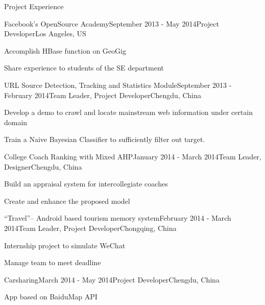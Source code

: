 \documentclass{resume} %
\begin{document}
\begin{rSection}{Project Experience}

\begin{rSubsection}{Facebook's OpenSource Academy}{September 2013 - May 2014}{Project Developer}{Los Angeles, US}
\item Accomplish HBase function on GeoGig
\item Share experience to students of the SE department 
\end{rSubsection}

\begin{rSubsection}{URL Source Detection, Tracking and Statistics Module}{September 2013 - February 2014}{Team Leader, Project Developer}{Chengdu, China}
\item Develop a demo to crawl and locate mainstream web information under certain domain
\item Train a Naive Bayesian Classifier to sufficiently filter out target.
\end{rSubsection}

\begin{rSubsection}{College Coach Ranking with Mixed AHP}{January 2014 - March 2014}{Team Leader, Designer}{Chengdu, China}
\item Build an appraisal system for intercollegiate coaches
\item Create and enhance the proposed model
\end{rSubsection}

\begin{rSubsection}{``Travel''-- Android based tourism memory system}{February 2014 - March 2014}{Team Leader, Project Developer}{Chongqing, China}
\item Internship project to simulate WeChat
\item Manage team to meet deadline
\end{rSubsection}

\begin{rSubsection}{Carsharing}{March 2014 - May 2014}{Project Developer}{Chengdu, China}
\item App based on BaiduMap API
\end{rSubsection}


\end{rSection}

\end{document}
